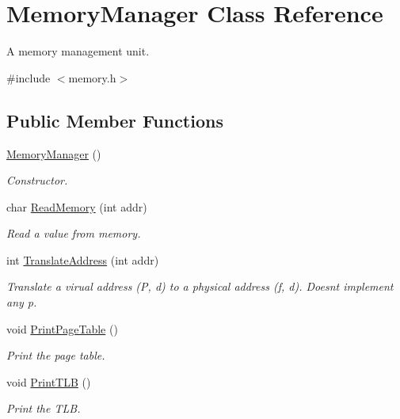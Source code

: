 \hypertarget{classMemoryManager}{}\section{Memory\+Manager Class Reference}
\label{classMemoryManager}


A memory management unit.  




{\ttfamily \#include $<$memory.\+h$>$}

\subsection*{Public Member Functions}
\begin{DoxyCompactItemize}
\item 
\hyperlink{classMemoryManager_ae925e8ad4d8fe6f0565e9d5729f59593}{Memory\+Manager} ()
\begin{DoxyCompactList}\small\item\em Constructor. \end{DoxyCompactList}\item 
char \hyperlink{classMemoryManager_a4a716fc46ee321ebb25bd54bcc9d0524}{Read\+Memory} (int addr)
\begin{DoxyCompactList}\small\item\em Read a value from memory. \end{DoxyCompactList}\item 
int \hyperlink{classMemoryManager_a905ceff7ad39c05c2d965af613156547}{Translate\+Address} (int addr)
\begin{DoxyCompactList}\small\item\em Translate a virual address (P, d) to a physical address (f, d). Doesn\textquotesingle{}t implement any p. \end{DoxyCompactList}\item 
void \hyperlink{classMemoryManager_aa7437efdc1ebd09895d451e2c521857a}{Print\+Page\+Table} ()
\begin{DoxyCompactList}\small\item\em Print the page table. \end{DoxyCompactList}\item 
void \hyperlink{classMemoryManager_a4bc5f491976e5253bf00a07a71b55ef6}{Print\+T\+LB} ()
\begin{DoxyCompactList}\small\item\em Print the T\+LB. \end{DoxyCompactList}\item 

\end{DoxyCompactItemize}
